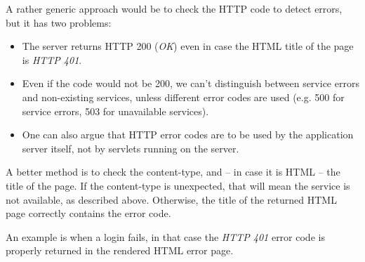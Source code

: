 A rather generic approach would be to check the HTTP code to detect errors, but it has two problems:

\begin{itemize}
\item The server returns HTTP 200 (\emph{OK}) even in case the HTML title of the page is \emph{HTTP 401}.
\item Even if the code would not be 200, we can't distinguish between service errors and non-existing services, unless different error codes are used (e.g. 500 for service errors, 503 for unavailable services).
\item One can also argue that HTTP error codes are to be used by the application server itself, not by servlets running on the server.
\end{itemize}

A better method is to check the content-type, and -- in case it is HTML -- the
title of the page.  If the content-type is unexpected, that will mean the
service is not available, as described above. Otherwise, the title of the
returned HTML page correctly contains the error code.

An example is when a login fails, in that case the \emph{HTTP 401} error code
is properly returned in the rendered HTML error page.
